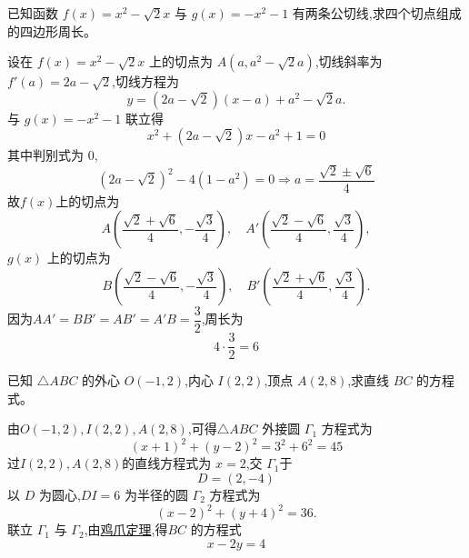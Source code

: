 \begin{questions}
    \question 已知函数 $f(x)=x^{2}-\sqrt{2}x$ 与 $g(x)=-x^{2}-1$ 有两条公切线,求四个切点组成的四边形周长。
    \begin{solution}
        设在 $f(x)=x^{2}-\sqrt{2}x$ 上的切点为 $A(a,a^2-\sqrt{2}a)$,切线斜率为 $f'(a)=2a-\sqrt{2}$,切线方程为
        \[
        y=(2a-\sqrt{2})(x-a)+a^2-\sqrt{2}a.
        \]
        与 $g(x)=-x^{2}-1$ 联立得
        \[
        x^2+(2a-\sqrt{2})x - a^2 +1 =0
        \]
        其中判别式为 $0$,
        \[
        (2a-\sqrt{2})^2 -4(1-a^2)=0 \Rightarrow a=\frac{\sqrt{2}\pm \sqrt{6}}{4}
        \]
        故$f(x)$上的切点为
        \[
        A\left(\frac{\sqrt{2}+\sqrt{6}}{4},-\frac{\sqrt{3}}{4}\right),\quad A'\left(\frac{\sqrt{2}-\sqrt{6}}{4},\frac{\sqrt{3}}{4}\right),
        \]
        $g(x)$ 上的切点为
        \[
        B\left(\frac{\sqrt{2}-\sqrt{6}}{4},-\frac{\sqrt{3}}{4}\right),\quad B'\left(\frac{\sqrt{2}+\sqrt{6}}{4},\frac{\sqrt{3}}{4}\right).
        \]
        因为$AA' = BB' = AB' = A'B = \dfrac{3}{2}$,周长为
        \[
        4\cdot \frac{3}{2} = 6
        \]
    \end{solution}

    \question 已知 $\triangle ABC$ 的外心 $O(-1,2)$,内心 $I(2,2)$,顶点 $A(2,8)$,求直线 $BC$ 的方程式。
    \begin{solution}
        由$O(-1,2), I(2,2), A(2,8)$,可得$\triangle ABC$ 外接圆 $\Gamma_1$ 方程式为
        \[
        (x+1)^2 + (y-2)^2 = 3^2+6^2 = 45
        \]
        过$I(2,2), A(2,8)$的直线方程式为 $x=2$,交 $\Gamma_1$于
        \[
        D = (2, -4)
        \]
        以 $D$ 为圆心,$DI = 6$ 为半径的圆 $\Gamma_2$ 方程式为
        \[
        (x-2)^2 + (y+4)^2 = 36.
        \]
        联立 $\Gamma_1$ 与 $\Gamma_2$,由\href{http://w.mathsgreat.com/SC/geom_th/geom_th_123.pdf}{鸡爪定理},得$BC$ 的方程式
        \[
        x - 2y = 4
        \]
    \end{solution}


\end{questions}
